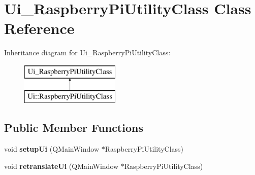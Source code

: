 \hypertarget{classUi__RaspberryPiUtilityClass}{}\section{Ui\+\_\+\+Raspberry\+Pi\+Utility\+Class Class Reference}
\label{classUi__RaspberryPiUtilityClass}
Inheritance diagram for Ui\+\_\+\+Raspberry\+Pi\+Utility\+Class\+:\begin{figure}[H]
\begin{center}
\leavevmode
\includegraphics[height=2.000000cm]{classUi__RaspberryPiUtilityClass}
\end{center}
\end{figure}
\subsection*{Public Member Functions}
\begin{DoxyCompactItemize}
\item 
\mbox{\label{classUi__RaspberryPiUtilityClass_a530158e1b67954b3015c42eb866bddd9}} 
void {\bfseries setup\+Ui} (Q\+Main\+Window $\ast$Raspberry\+Pi\+Utility\+Class)
\item 
\mbox{\label{classUi__RaspberryPiUtilityClass_a3b2d92eeae3b31cd38c14d07e808137a}} 
void {\bfseries retranslate\+Ui} (Q\+Main\+Window $\ast$Raspberry\+Pi\+Utility\+Class)
\end{DoxyCompactItemize}
